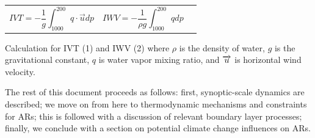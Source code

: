 \documentclass[letterpaper,12pt]{article}
\begin{document}
\noindent
\begin{tabularx}{\linewidth}{XXX}

\begin{equation} \label{1}
   	IVT =  - \frac{1}{g} \int^{200}_{1000} q \cdot \overrightarrow{u} dp 
\end{equation}
& 
\begin{equation} \label{2}
	IWV = - \frac{1}{\rho g} \int^{200}_{1000} q dp 
\end{equation}

\end{tabularx}

{\footnotesize Calculation for IVT (1) and IWV (2) where $\rho$ is the density of water, $g$ is the gravitational constant, $q$ is water vapor mixing ratio, and $\protect\overrightarrow{u}$ is horizontal wind velocity.}


The rest of this document proceeds as follows: first, synoptic-scale dynamics are described; we move on from here to thermodynamic mechanisms and constraints for ARs; this is followed with a discussion of relevant boundary layer processes; finally, we conclude with a section on potential climate change influences on ARs. %



\end{document}

